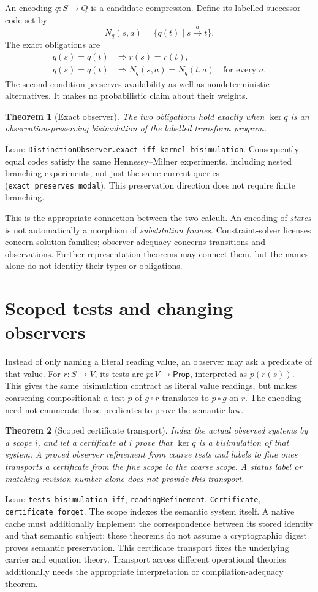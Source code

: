 \documentclass[11pt]{article}
\newtheorem{theorem}{Theorem}
\newcommand{\lean}[1]{\nolinkurl{#1}}
\begin{document}
An encoding $q:S\to Q$ is a candidate compression. Define its labelled
successor-code set by
\[
 N_q(s,a)=\{q(t)\mid s\xrightarrow{a}t\}.
\]
The exact obligations are
\begin{align*}
q(s)=q(t)&\Longrightarrow r(s)=r(t),\\
q(s)=q(t)&\Longrightarrow N_q(s,a)=N_q(t,a)\quad\text{for every }a.
\end{align*}
The second condition preserves availability as well as nondeterministic
alternatives. It makes no probabilistic claim about their weights.

\begin{theorem}[Exact observer]
The two obligations hold exactly when $\ker q$ is an observation-preserving
bisimulation of the labelled transform program.
\end{theorem}
\noindent Lean: \lean{DistinctionObserver.exact_iff_kernel_bisimulation}.
Consequently equal codes satisfy the same Hennessy--Milner experiments,
including nested branching experiments, not just the same current queries
(\lean{exact_preserves_modal}). This preservation direction does not require
finite branching.

This is the appropriate connection between the two calculi. An encoding of
\emph{states} is not automatically a morphism of \emph{substitution frames}.
Constraint-solver licenses concern solution families; observer adequacy
concerns transitions and observations. Further representation theorems may
connect them, but the names alone do not identify their types or obligations.

\section{Scoped tests and changing observers}
Instead of only naming a literal reading value, an observer may ask a
predicate of that value. For $r:S\to V$, its tests are $p:V\to\mathsf{Prop}$,
interpreted as $p(r(s))$. This gives the same bisimulation contract as literal
value readings, but makes coarsening compositional: a test $p$ of $g\circ r$
translates to $p\circ g$ on $r$. The encoding need not enumerate these
predicates to prove the semantic law.

\begin{theorem}[Scoped certificate transport]
Index the actual observed systems by a scope $i$, and let a certificate at
$i$ prove that $\ker q$ is a bisimulation of that system. A proved observer
refinement from coarse tests and labels to fine ones transports a certificate
from the fine scope to the coarse scope. A status label or matching revision
number alone does not provide this transport.
\end{theorem}
\noindent Lean: \lean{tests_bisimulation_iff}, \lean{readingRefinement},
\lean{Certificate}, \lean{certificate_forget}. The scope indexes the semantic
system itself. A native cache must additionally implement the correspondence
between its stored identity and that semantic subject; these theorems do not
assume a cryptographic digest proves semantic preservation.
This certificate transport fixes the underlying carrier and equation theory.
Transport across different operational theories additionally needs the
appropriate interpretation or compilation-adequacy theorem.
\end{document}
